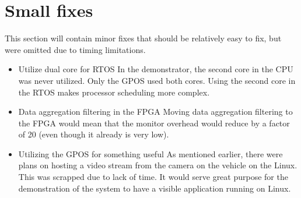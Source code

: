 
\section{Small fixes}
This section will contain minor fixes that should be relatively easy to fix, but were omitted due to timing limitations.

\begin{itemize}
\item Utilize dual core for RTOS \- In the demonstrator, the second core in the CPU was never utilized. Only the GPOS used both cores. Using the second core in the RTOS makes processor scheduling more complex.

\item Data aggregation filtering in the FPGA \- Moving data aggregation filtering to the FPGA would mean that the monitor overhead would reduce by a factor of 20 (even though it already is very low).

\item Utilizing the GPOS for something useful \- As mentioned earlier, there were plans on hosting a video stream from the camera on the vehicle on the Linux. This was scrapped due to lack of time. It would serve great purpose for the demonstration of the system to have a visible application running on Linux.


\end{itemize}
